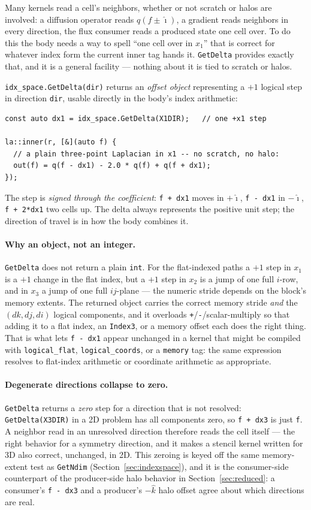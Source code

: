 \documentclass[11pt]{article}
\newcommand{\code}[1]{\lstinline[basicstyle=\ttfamily]|#1|}
\begin{document}
Many kernels read a cell's neighbors, whether or not scratch or halos are
involved: a diffusion operator reads $q(f\pm\hat{\imath})$, a gradient reads
neighbors in every direction, the flux consumer reads a produced state one cell
over. To do this the body needs a way to spell ``one cell over in $x_1$'' that is
correct for whatever index form the current inner tag hands it. \code{GetDelta}
provides exactly that, and it is a general facility --- nothing about it is tied to
scratch or halos.

\code{idx_space.GetDelta(dir)} returns an \emph{offset object} representing a
$+1$ logical step in direction \code{dir}, usable directly in the body's index
arithmetic:
\begin{lstlisting}
const auto dx1 = idx_space.GetDelta(X1DIR);   // one +x1 step

la::inner(r, [&](auto f) {
  // a plain three-point Laplacian in x1 -- no scratch, no halo:
  out(f) = q(f - dx1) - 2.0 * q(f) + q(f + dx1);
});
\end{lstlisting}
The step is \emph{signed through the coefficient}: \code{f + dx1} moves in
$+\hat{\imath}$, \code{f - dx1} in $-\hat{\imath}$, \code{f + 2*dx1} two cells up.
The delta always represents the positive unit step; the direction of travel is in
how the body combines it.

\paragraph{Why an object, not an integer.} \code{GetDelta} does not return a plain
\code{int}. For the flat-indexed paths a $+1$ step in $x_1$ is a $+1$ change in the
flat index, but a $+1$ step in $x_2$ is a jump of one full $i$-row, and in $x_3$ a
jump of one full $ij$-plane --- the numeric stride depends on the block's memory
extents. The returned object carries the correct memory stride \emph{and} the
$(dk,dj,di)$ logical components, and it overloads \code{+}/\code{-}/scalar-multiply
so that adding it to a flat index, an \code{Index3}, or a memory offset each does
the right thing. That is what lets \code{f - dx1} appear unchanged in a kernel that
might be compiled with \code{logical_flat}, \code{logical_coords}, or a
\code{memory} tag: the same expression resolves to flat-index arithmetic or
coordinate arithmetic as appropriate.

\paragraph{Degenerate directions collapse to zero.} \code{GetDelta} returns a
\emph{zero} step for a direction that is not resolved: \code{GetDelta(X3DIR)} in a
2D problem has all components zero, so \code{f + dx3} is just \code{f}. A neighbor
read in an unresolved direction therefore reads the cell itself --- the right
behavior for a symmetry direction, and it makes a stencil kernel written for 3D
also correct, unchanged, in 2D. This zeroing is keyed off the same memory-extent
test as \code{GetNdim} (Section~\ref{sec:indexspace}), and it is the consumer-side
counterpart of the producer-side halo behavior in
Section~\ref{sec:reduced}: a consumer's \code{f - dx3} and a producer's $-\hat{k}$
halo offset agree about which directions are real.
\end{document}
